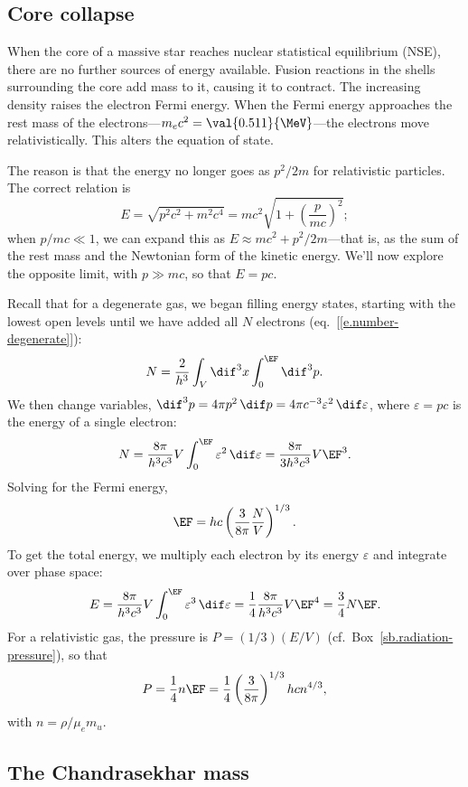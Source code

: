 \subsection{Core collapse}
When the core of a massive star reaches nuclear statistical equilibrium (NSE), there are no further sources of energy available. Fusion reactions in the shells surrounding the core add mass to it, causing it to contract. The increasing density raises the electron Fermi energy. When the Fermi energy approaches the rest mass of the electrons---$m_{e}c^{2} = \val{0.511}{\MeV}$---the electrons move relativistically. This alters the equation of state.

The reason is that the energy no longer goes as $p^{2}/2m$ for relativistic particles. The correct relation is
\[
	E = \sqrt{p^{2}c^{2} + m^{2}c^{4}} = mc^{2}\sqrt{1 + \left(\frac{p}{mc}\right)^{2}};
\]
when $p/mc\ll 1$, we can expand this as $E\approx m c^{2} + p^{2}/2m$---that is, as the sum of the rest mass and the Newtonian form of the kinetic energy. We'll now explore the opposite limit, with $p \gg mc$, so that $E = pc$.

Recall that for a degenerate gas, we began filling energy states, starting with the lowest open levels until we have added all $N$ electrons (eq.~[\ref{e.number-degenerate}]):
\[
	N = \frac{2}{h^{3}}\int_{V}\dif^{3}x\int_{0}^{\EF}\dif^{3}p.
\]
We then change variables, $\dif^{3}p = 4\pi p^{2}\,\dif p = 4\pi c^{-3}\varepsilon^{2}\,\dif\varepsilon$, where $\varepsilon = pc$ is the energy of a single electron:
\[
	N = \frac{8\pi}{h^{3}c^{3}}V \int_{0}^{\EF} \varepsilon^{2}\,\dif\varepsilon
	= \frac{8\pi}{3h^{3}c^{3}} V  \EF^{3}.
\]
Solving for the Fermi energy,
\[
	\EF = hc\left(\frac{3}{8\pi}\frac{N}{V}\right)^{1/3}.
\]
To get the total energy, we multiply each electron by its energy $\varepsilon$ and integrate over phase space:
\[
	E = \frac{8\pi}{h^{3}c^{3}}V\int_{0}^{\EF}\varepsilon^{3}\,\dif\varepsilon = 
		\frac{1}{4}\frac{8\pi}{h^{3}c^{3}}V\EF^{4} = \frac{3}{4}N\EF.
\]
For a relativistic gas, the pressure is $P = (1/3)(E/V)$ (cf.\ Box~\ref{sb.radiation-pressure}), so that
\begin{equation}
\label{e.pressure-relativistic}
	P = \frac{1}{4}n\EF = \frac{1}{4}\left(\frac{3}{8\pi}\right)^{1/3}hc n^{4/3},
\end{equation}
with $n = \rho/\mu_{e}m_{u}$.

\subsection{The Chandrasekhar mass}

